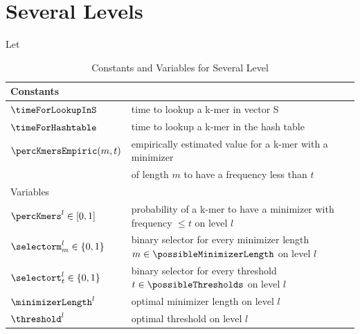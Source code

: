 \section*{Several Levels}
Let
\begin{table}
	\caption{Constants and Variables for Several Level}
	\begin{tabularx}{\columnwidth}{|| l | X ||}
		\hline
		Constants	&  \\
		\hline
		$\timeForLookupInS$		& time to lookup a k-mer in vector S\\
		$\timeForHashtable$		& time to lookup a k-mer in the hash table \\
		$\percKmersEmpiric(m, t)$ &empirically estimated value for a k-mer with a minimizer \\
		& of length $m$ to have a frequency less than $t$ \\
		\hline
		\hline
		Variables	&  \\
		\hline
		$\percKmers^l \in \left[0,1\right]$ & probability of a k-mer to have a minimizer with frequency $\leq t$ on level $l$ \\
		$\selectorm_m^l \in \left\{0, 1\right\}$	& binary selector for every minimizer length $m \in \possibleMinimizerLength$ on level $l$\\
		$\selectort_t^l \in \left\{0, 1\right\}$	& binary selector for every threshold $t \in \possibleThresholds$ on level $l$\\
		$\minimizerLength^l$ & optimal minimizer length on level $l$\\
		$\threshold^l$ & optimal threshold on level $l$\\
		\hline 
	\end{tabularx}\\
\end{table}
